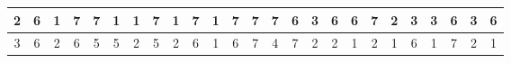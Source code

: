 \begin{sidewaystable}[]
\begin{tabular}{|c|c|c|c|c|c|c|c|c|c|c|c|c|c|c|c|c|c|c|c|c|c|c|c|c|}
    2       & 6                                               & 1                                               & 7                                               & 7                                               & 1                                               & 1                                               & 7                                               & 1                                               & 7                                               & 1                                                & 7                                                & 7                                                & 7                                               & 6                                               & 3                                               & 6                                               & 6                                               & 7                                               & 2                                               & 3                                               & 3                                               & 6                                                & 3                                                & 6                                                \\ \hline
    3       & 6                                               & 2                                               & 6                                               & 5                                               & 5                                               & 2                                               & 5                                               & 2                                               & 6                                               & 1                                                & 6                                                & 7                                                & 4                                               & 7                                               & 2                                               & 2                                               & 1                                               & 2                                               & 1                                               & 6                                               & 1                                               & 7                                                & 2                                                & 1                                                \\ \hline

\end{tabular}
\end{sidewaystable}
